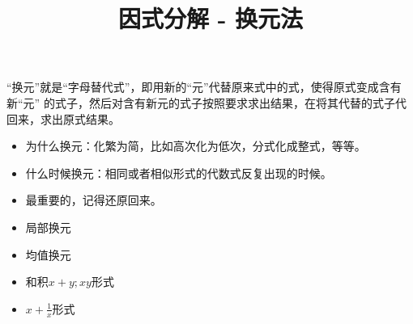 \documentclass[windows,csize4,answers]{BHCexam}
\title{因式分解 - 换元法}
\begin{document}
\maketitle

\begin{groups}
    “换元”就是“字母替代式”，即用新的“元”代替原来式中的式，使得原式变成含有新“元”
    的式子，然后对含有新元的式子按照要求求出结果，在将其代替的式子代回来，求出原式结果。
    \begin{itemize}
        \item 为什么换元：化繁为简，比如高次化为低次，分式化成整式，等等。
        \item 什么时候换元：相同或者相似形式的代数式反复出现的时候。
        \item 最重要的，记得还原回来。
    \end{itemize}

    \begin{itemize}
        \item 局部换元
        \item 均值换元
        \item 和积$x+y;xy$形式
        \item $x+\frac{1}{x}$形式
    \end{itemize}


\end{groups}
\end{document}

